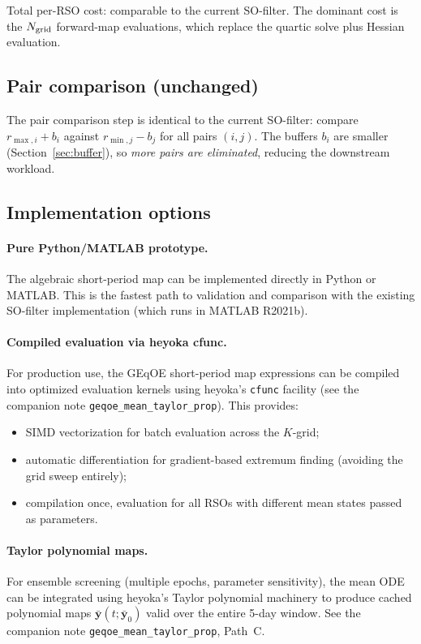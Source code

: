 \documentclass[11pt]{article}
\begin{document}
Total per-RSO cost: comparable to the current SO-filter. The dominant cost
is the $N_{\rm grid}$ forward-map evaluations, which replace the quartic solve
plus Hessian evaluation.

\subsection{Pair comparison (unchanged)}

The pair comparison step is identical to the current SO-filter: compare
$r_{\max,i} + b_i$ against $r_{\min,j} - b_j$ for all pairs $(i,j)$.
The buffers $b_i$ are smaller (Section~\ref{sec:buffer}), so \emph{more pairs
are eliminated}, reducing the downstream workload.

\subsection{Implementation options}

\paragraph{Pure Python/MATLAB prototype.}
The algebraic short-period map can be implemented directly in Python or
MATLAB. This is the fastest path to validation and comparison with the
existing SO-filter implementation (which runs in MATLAB R2021b).

\paragraph{Compiled evaluation via heyoka cfunc.}
For production use, the GEqOE short-period map expressions can be compiled
into optimized evaluation kernels using heyoka's \texttt{cfunc} facility (see
the companion note \texttt{geqoe\_mean\_taylor\_prop}). This provides:
\begin{itemize}
\item SIMD vectorization for batch evaluation across the $K$-grid;
\item automatic differentiation for gradient-based extremum finding
(avoiding the grid sweep entirely);
\item compilation once, evaluation for all RSOs with different mean states
passed as parameters.
\end{itemize}

\paragraph{Taylor polynomial maps.}
For ensemble screening (multiple epochs, parameter sensitivity), the mean ODE
can be integrated using heyoka's Taylor polynomial machinery to produce
cached polynomial maps $\bar{\bm y}(t; \bar{\bm y}_0)$ valid over the entire
5-day window. See the companion note \texttt{geqoe\_mean\_taylor\_prop},
Path~C.
\end{document}
